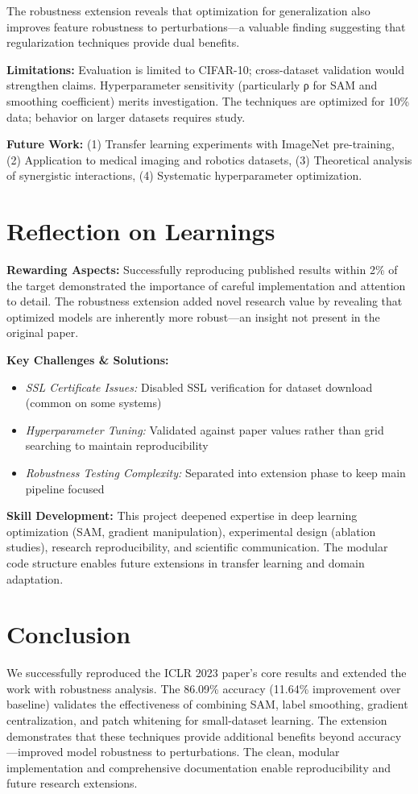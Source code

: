 \documentclass[11pt,a4paper]{article}
\begin{document}
The robustness extension reveals that optimization for generalization also improves feature robustness to perturbations—a valuable finding suggesting that regularization techniques provide dual benefits.

\textbf{Limitations:} Evaluation is limited to CIFAR-10; cross-dataset validation would strengthen claims. Hyperparameter sensitivity (particularly ρ for SAM and smoothing coefficient) merits investigation. The techniques are optimized for 10\% data; behavior on larger datasets requires study.

\textbf{Future Work:} (1) Transfer learning experiments with ImageNet pre-training, (2) Application to medical imaging and robotics datasets, (3) Theoretical analysis of synergistic interactions, (4) Systematic hyperparameter optimization.

\section{Reflection on Learnings}

\textbf{Rewarding Aspects:} Successfully reproducing published results within 2\% of the target demonstrated the importance of careful implementation and attention to detail. The robustness extension added novel research value by revealing that optimized models are inherently more robust—an insight not present in the original paper.

\textbf{Key Challenges \& Solutions:}
\begin{itemize}
    \item \textit{SSL Certificate Issues:} Disabled SSL verification for dataset download (common on some systems)
    \item \textit{Hyperparameter Tuning:} Validated against paper values rather than grid searching to maintain reproducibility
    \item \textit{Robustness Testing Complexity:} Separated into extension phase to keep main pipeline focused
\end{itemize}

\textbf{Skill Development:} This project deepened expertise in deep learning optimization (SAM, gradient manipulation), experimental design (ablation studies), research reproducibility, and scientific communication. The modular code structure enables future extensions in transfer learning and domain adaptation.

\section*{Conclusion}

We successfully reproduced the ICLR 2023 paper's core results and extended the work with robustness analysis. The 86.09\% accuracy (11.64\% improvement over baseline) validates the effectiveness of combining SAM, label smoothing, gradient centralization, and patch whitening for small-dataset learning. The extension demonstrates that these techniques provide additional benefits beyond accuracy—improved model robustness to perturbations. The clean, modular implementation and comprehensive documentation enable reproducibility and future research extensions.
\end{document}
